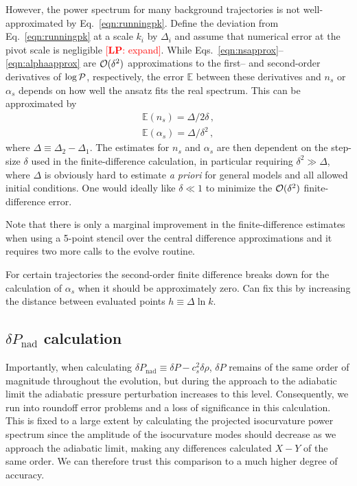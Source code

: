 \documentclass[11pt]{article}
\def\calP{{\cal P}}
\def\calO{{\cal O}}
\newcommand{\lp}[1]{\textcolor{red}{[{\bf LP}: #1]}}
\begin{document}
However, the power spectrum for many background trajectories is not well-approximated by Eq.~\eqref{eqn:runningpk}.  Define the deviation from Eq.~\eqref{eqn:runningpk} at a scale $k_i$ by $\Delta_i$  and assume that numerical error at the pivot scale is negligible \lp{expand}. While Eqs.~\eqref{eqn:nsapprox}--\eqref{eqn:alphaapprox} are $\calO (\delta^2)$ approximations to the first-- and second-order derivatives of $\log \calP$, respectively, the error $\mathbb E$ between these derivatives and $n_s$ or $\alpha_s$ depends on how well the ansatz fits the real spectrum.  This can be approximated by
\begin{eqnarray}
  \mathbb E (n_s) = \Delta/2 \delta \, , \\
  \mathbb E (\alpha_s) = \Delta/\delta^2 \, ,
  \label{eqn:XXX}
\end{eqnarray}
where $\Delta \equiv \Delta_2 - \Delta_1$.  The estimates for $n_s$ and $\alpha_s$ are then dependent on the step-size $\delta$ used in the finite-difference calculation, in particular requiring $\delta^2 \gg \Delta$, where $\Delta$ is obviously hard to estimate \emph{a priori} for general models and all allowed initial conditions.  One would ideally like $\delta \ll 1$ to minimize the $\calO (\delta^2)$ finite-difference error.

Note that there is only a marginal improvement in the finite-difference estimates when using a 5-point stencil over the central difference approximations and it requires two more calls to the evolve routine.


For certain trajectories the second-order finite difference breaks down for the calculation of $\alpha_s$ when it should be approximately zero.  Can fix this by increasing the distance between evaluated points $h \equiv \Delta \ln k$.


\subsection{$\delta P_\mathrm{nad}$ calculation}

Importantly, when calculating $\delta P_\mathrm{nad} \equiv \delta P - c_s^2 \delta \rho$, $\delta P$ remains of the same order of magnitude throughout the evolution, but during the approach to the adiabatic limit the adiabatic pressure perturbation increases to this level.  Consequently, we run into roundoff error problems and a loss of significance in this calculation.  This is fixed to a large extent by calculating the projected isocurvature power spectrum since the amplitude of the isocurvature modes should decrease as we approach the adiabatic limit, making any differences calculated $X-Y$ of the same order.  We can therefore trust this comparison to a much higher degree of accuracy.
\end{document}
